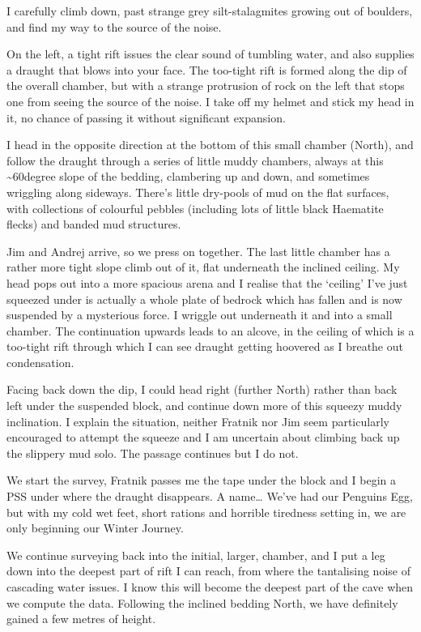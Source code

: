 I carefully climb down, past strange grey silt-stalagmites growing out
of boulders, and find my way to the source of the noise.

On the left, a tight rift issues the clear sound of tumbling water, and
also supplies a draught that blows into your face. The too-tight rift is
formed along the dip of the overall chamber, but with a strange
protrusion of rock on the left that stops one from seeing the source of
the noise. I take off my helmet and stick my head in it, no chance of
passing it without significant expansion.

I head in the opposite direction at the bottom of this small chamber
(North), and follow the draught through a series of little muddy
chambers, always at this \textasciitilde{}60degree slope of the bedding,
clambering up and down, and sometimes wriggling along sideways. There's
little dry-pools of mud on the flat surfaces, with collections of
colourful pebbles (including lots of little black Haematite flecks) and
banded mud structures.

Jim and Andrej arrive, so we press on together. The last little chamber
has a rather more tight slope climb out of it, flat underneath the
inclined ceiling. My head pops out into a more spacious arena and I
realise that the `ceiling' I've just squeezed under is actually a whole
plate of bedrock which has fallen and is now suspended by a mysterious
force. I wriggle out underneath it and into a small chamber. The
continuation upwards leads to an alcove, in the ceiling of which is a
too-tight rift through which I can see draught getting hoovered as I
breathe out condensation.

Facing back down the dip, I could head right (further North) rather than
back left under the suspended block, and continue down more of this
squeezy muddy inclination. I explain the situation, neither Fratnik nor
Jim seem particularly encouraged to attempt the squeeze and I am
uncertain about climbing back up the slippery mud solo. The passage
continues but I do not.

We start the survey, Fratnik passes me the tape under the block and I
begin a PSS under where the draught disappears. A name\ldots{} We've had
our Penguins Egg, but with my cold wet feet, short rations and horrible
tiredness setting in, we are only beginning our Winter Journey.

We continue surveying back into the initial, larger, chamber, and I put
a leg down into the deepest part of rift I can reach, from where the
tantalising noise of cascading water issues. I know this will become the
deepest part of the cave when we compute the data. Following the
inclined bedding North, we have definitely gained a few metres of
height.

